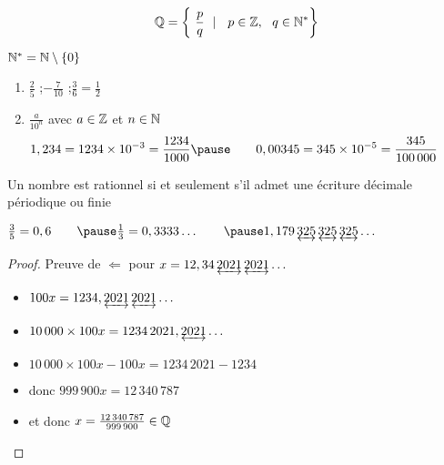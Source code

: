 \begin{frame}

\begin{mydefinition}
	\[
\Qq = \left\{ \ \frac{p}{q}  \ \mid\ \   p\in \Zz,\ \  q\in \Nn^*\right\}
\]
\end{mydefinition}
\pause
$\mathbb{N}^*=\mathbb{N}\setminus\left\{ 0 \right\}$
\pause

\begin{exemple}
	\begin{enumerate}
		\item $\displaystyle \frac25$ \quad;\quad $\displaystyle-\frac{7}{10}$ \quad;\quad $\displaystyle\frac36=\frac12$
\pause
\medskip
		\item $\displaystyle\frac{a}{10^n}$ \quad 
avec $a\in \mathbb{Z}$ et $n\in \mathbb{N}$
\pause
$$\hspace*{-2em}1,234=1234\times 10^{-3}=\frac{1234}{1000} 
\pause\qquad 0,00345=345\times 10^{-5}=\frac{345}{100\,000}$$
	\end{enumerate}
	
\end{exemple}

\end{frame}



\begin{frame}

\begin{proposition}
Un nombre est rationnel si et seulement s'il admet une écriture décimale périodique ou finie
\end{proposition}\pause

	

\begin{exemple}
$\frac{3}{5}=0,6\qquad\pause \frac{1}{3}=0,3333\ldots \qquad \pause
1,179\,\underleftrightarrow{325}\,\underleftrightarrow{325}\,\underleftrightarrow{325}\ldots $
\end{exemple}\pause


\begin{proof}
Preuve de $\Longleftarrow$ pour $x = 12,34\,\underleftrightarrow{2021}\,\underleftrightarrow{2021}\ldots$
\pause

\begin{itemize}
\setlength{\itemsep}{6pt}
 \item $100x = 1234,\underleftrightarrow{2021}\,\underleftrightarrow{2021}\ldots$
\pause
 \item $10\,000 \times 100  x = 1234 \, 2021,\underleftrightarrow{2021}\ldots$
\pause
 \item $10\,000 \times 100 x-100x=1234 \, 2021-1234$
\pause
 \item donc $999\,900x=12\,340\,787$
\pause
 \item et donc $x=\frac{12\,340\,787}{999\,900}\in\mathbb{Q}$
\end{itemize}
\vspace*{-3ex}
\end{proof}
\end{frame}

